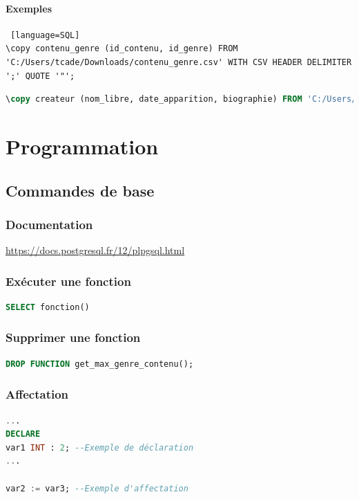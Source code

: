 \subsubsection{Exemples}
\begin{lstlisting} [language=SQL]
\copy contenu_genre (id_contenu, id_genre) FROM 'C:/Users/tcade/Downloads/contenu_genre.csv' WITH CSV HEADER DELIMITER ';' QUOTE '"';
\end{lstlisting}

\begin{lstlisting}[language=SQL]
\copy createur (nom_libre, date_apparition, biographie) FROM 'C:/Users/tcade/Downloads/contenu_genre.csv' WITH CSV HEADER DELIMITER ';' QUOTE '"';
\end{lstlisting}

\chapter{Programmation}
\minitoc

\section{Commandes de base}
\subsection{Documentation}
\href{https://docs.postgresql.fr/12/plpgsql.html}{https://docs.postgresql.fr/12/plpgsql.html}

\subsection{Exécuter une fonction}
\begin{lstlisting}[language=SQL]
SELECT fonction()
\end{lstlisting}

\subsection{Supprimer une fonction}
\begin{lstlisting}[language=SQL]
DROP FUNCTION get_max_genre_contenu();
\end{lstlisting}

\subsection{Affectation}
\begin{lstlisting}[language=SQL]
...
DECLARE
var1 INT : 2; --Exemple de déclaration
...

var2 := var3; --Exemple d'affectation
\end{lstlisting}


